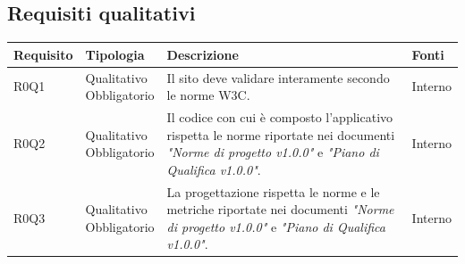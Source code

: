 \documentclass[12pt,a4paper,titlepage]{article}
\newcommand{\minitab}[2][1]{\begin{tabular}#1 #2\end{tabular}}
\begin{document}
	\subsection{Requisiti qualitativi}
	{\renewcommand\arraystretch{1.2}  %
		\small
		\begin{longtable}{|m{5em}|m{6em}|m{28em}|m{5em}|}
			\hline
			\textbf{Requisito} & \textbf{Tipologia}  & \textbf{Descrizione} & \textbf{Fonti} \\
			\hline
			R0Q1 & \minitab[c]{Qualitativo\\Obbligatorio} & Il sito deve validare interamente secondo le norme W3C. & Interno\\
			\hline
			R0Q2 & \minitab[c]{Qualitativo\\Obbligatorio} & Il codice con cui è composto l'applicativo rispetta le norme riportate nei documenti \textit{"Norme di progetto v1.0.0"} e \textit{"Piano di Qualifica v1.0.0"}. & Interno\\
			\hline
			R0Q3 & \minitab[c]{Qualitativo\\Obbligatorio} & La progettazione rispetta le norme e le metriche riportate nei documenti \textit{"Norme di progetto v1.0.0"} e \textit{"Piano di Qualifica v1.0.0"}. & Interno\\
			\hline
		\end{longtable}
	}
	\newpage
\end{document}
